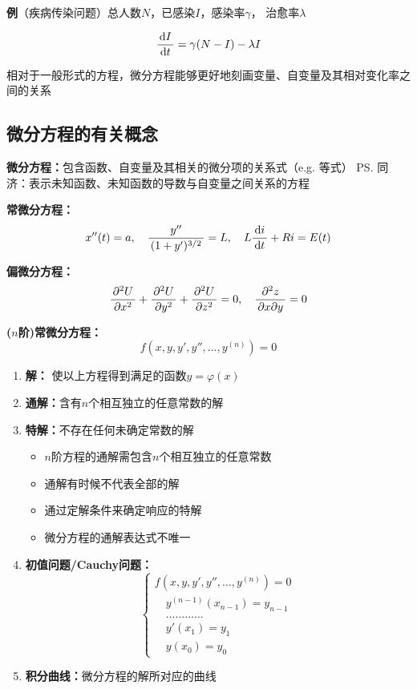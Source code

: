 {\bf 例}（疾病传染问题）总人数$N$，已感染$I$，感染率$\gamma$，
治愈率$\lambda$

$$\displaystyle\frac{\,{\mathrm{d} I}\,}{\,{\mathrm{d} t}\,}=\gamma (N-I)-\lambda I$$

相对于一般形式的方程，微分方程能够更好地刻画变量、自变量及其相对变化率之间的关系

\subsection{微分方程的有关概念}

{\bf 微分方程：}包含函数、自变量及其相关的微分项的关系式（e.g. 等式）
\ps{同济：表示未知函数、未知函数的导数与自变量之间关系的方程}

{\bf 常微分方程：} 
  $$x''(t)=a,\quad  \displaystyle\frac{\,{y''}\,}{\,{(1+y')^{3/2}}\,}=L,\quad 
  L\displaystyle\frac{\,{\mathrm{d} i}\,}{\,{\mathrm{d} t}\,}+Ri=E(t)$$ 
  
{\bf 偏微分方程：} 
  $$\displaystyle\frac{\,{\partial^2U}\,}{\,{\partial x^2}\,}+\displaystyle\frac{\,{\partial^2U}\,}{\,{\partial y^2}\,}+\displaystyle\frac{\,{\partial^2U}\,}{\,{\partial z^2}\,}=0,\quad 
  \displaystyle\frac{\,{\partial^2z}\,}{\,{\partial x\partial y}\,}=0$$

{\bf ($n$阶)常微分方程：}
$$f(x,y,y',y'',\ldots,y^{(n)})=0$$

\begin{enumerate}[(1)]
  \setlength{\itemindent}{1cm}
  \item {\bf 解：} 使以上方程得到满足的函数$y=\varphi(x)$ 
  \item {\bf 通解：}含有$n$个相互独立的任意常数的解  
  \item {\bf 特解：}不存在任何未确定常数的解 
  \begin{itemize}
    \item $n$阶方程的通解需包含$n$个相互独立的任意常数
    \item 通解有时候不代表全部的解
    \item 通过定解条件来确定响应的特解
    \item 微分方程的通解表达式不唯一
  \end{itemize} 
  \item {\bf 初值问题/Cauchy问题：}
  $$
  \left\{\begin{array}{l}
  	f(x,y,y',y'',\ldots,y^{(n)})=0\\
  	\quad{y^{(n-1)}(x_{n-1})=y_{n-1}}\\
  	\quad{\ldots\ldots\ldots\ldots}\\
  	\quad{y'(x_1)=y_1}\\
  	\quad{y(x_0)=y_0}
  \end{array}\right.
  $$
  \item {\bf 积分曲线：}微分方程的解所对应的曲线
\end{enumerate}

